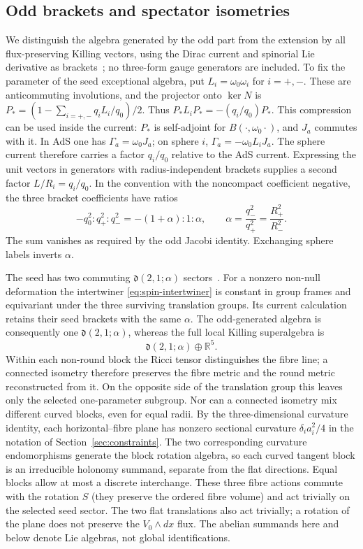 \subsection{Odd brackets and spectator isometries}
We distinguish the algebra generated by the odd part from the extension by
all flux-preserving Killing vectors, using the Dirac current and spinorial
Lie derivative as brackets~\cite{FOF}; no three-form gauge generators are
included. To fix the parameter of the seed exceptional algebra, put
$L_i=\omega_0\omega_i$ for $i=+,-$. These are anticommuting involutions,
and the projector onto $\ker N$ is $P_*=(1-\sum_{i=+,-}q_i L_i/q_0)/2$.
Thus $P_*L_iP_*=-(q_i/q_0)P_*$. This compression can be used inside the
current: $P_*$ is self-adjoint for $B(\cdot,\omega_0\cdot)$, and $J_a$
commutes with it. In AdS one has $\Gamma_a=\omega_0J_a$; on sphere $i$,
$\Gamma_a=-\omega_0 L_i J_a$. The sphere current therefore carries a
factor $q_i/q_0$ relative to the AdS current. Expressing the unit vectors
in generators with radius-independent brackets supplies a second factor
$L/R_i=q_i/q_0$. In the convention with the noncompact coefficient
negative, the three bracket coefficients have ratios
\begin{equation}\label{eq:spin-alpha}
 -q_0^2:q_+^2:q_-^2=-(1+\alpha):1:\alpha,\qquad
 \alpha=\frac{q_-^2}{q_+^2}=\frac{R_+^2}{R_-^2} .
\end{equation}
The sum vanishes as required by the odd Jacobi identity. Exchanging sphere
labels inverts $\alpha$.

The seed has two commuting $\mathfrak d(2,1;\alpha)$ sectors~\cite{GGP}. For a
nonzero non-null deformation the intertwiner \eqref{eq:spin-intertwiner}
is constant in group frames and equivariant under the three surviving
translation groups. Its current calculation retains their seed brackets
with the same $\alpha$. The odd-generated algebra is consequently one
$\mathfrak d(2,1;\alpha)$, whereas the full local Killing superalgebra is
\[
 \mathfrak d(2,1;\alpha)\oplus\mathbb R^5 .
\]
Within each non-round block the Ricci tensor distinguishes the fibre line; a connected isometry therefore preserves the fibre metric and the round metric reconstructed from it. On the opposite side of the translation group this leaves only the selected one-parameter subgroup. Nor can a connected isometry mix different curved blocks, even for equal radii. By the three-dimensional curvature identity, each horizontal--fibre plane has nonzero sectional curvature $\delta_i a_i^2/4$ in the notation of Section~\ref{sec:constraints}. The two corresponding curvature endomorphisms generate the block rotation algebra, so each curved tangent block is an irreducible holonomy summand, separate from the flat directions. Equal blocks allow at most a discrete interchange. These three fibre actions commute with the rotation $S$
(they preserve the ordered fibre volume) and act trivially on the selected
seed sector. The two flat translations also act trivially; a rotation of
the plane does not preserve the $V_0\wedge dx$ flux. The abelian summands
here and below denote Lie algebras, not global identifications.

